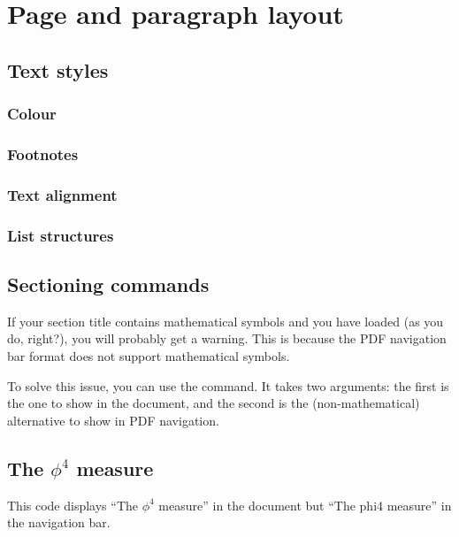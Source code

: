 \chapter{Page and paragraph layout}

\section{Text styles}

\subsection{Colour}

\subsection{Footnotes}


\subsection{Text alignment}

\subsection{List structures}



%
%
%
\section{Sectioning commands}

\begin{gotcha}
If your section title contains mathematical symbols
and you have  loaded (as you do, right?),
you will probably get a warning.
This is because the PDF navigation bar format does not support mathematical symbols.

To solve this issue, you can use the  command.
It takes two arguments: the first is the one to show in the document,
and the second is the (non-mathematical) alternative to show in PDF navigation.
\begin{ExampleCode}
\section{The \texorpdfstring{$\phi^4$}{phi4} measure}
\end{ExampleCode}
This code displays ``The $\phi^4$ measure'' in the document
but ``The phi4 measure'' in the navigation bar.
\end{gotcha}

